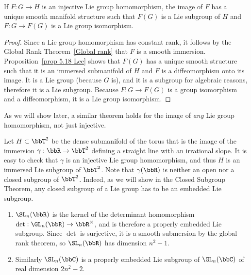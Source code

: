 \begin{prop}
    If $F:G\to H$ is an injective Lie group homomorphism, the image of $F$ has a unique smooth manifold structure such that $F(G)$ is a Lie subgroup of $H$ and $F:G\to F(G)$ is a Lie group isomorphism.
\end{prop}
\begin{proof}
    Since a Lie group homomorphism has constant rank, it follows by the Global Rank Theorem~\ref{Global rank} that $F$ is a smooth immersion. Proposition~\ref{prop 5.18 Lee} shows that $F(G)$ has a unique smooth structure such that it is an immersed submanifold of $H$ and $F$ is a diffeomorphism onto its image. It is a Lie group (because $G$ is), and it is a subgroup for algebraic reasons, therefore it is a Lie subgroup. Because $F:G\to F(G)$ is a group isomorphism and a diffeomorphism, it is a Lie group isomorphism.
\end{proof}
\begin{rem}
    As we will show later, a similar theorem holds for the image of \emph{any} Lie group homomorphism, not just injective.
\end{rem}

\begin{example}
    Let $H\subset \bbT^2$ be the dense submanifold of the torus that is the image of the immersion $\gamma:\bbR\to\bbT^2$ defining a straight line with an irrational slope. It is easy to check that $\gamma$ is an injective Lie group homomorphism, and thus $H$ is an immersed Lie subgroup of $\bbT^2$. Note that $\gamma(\bbR)$ is neither an open nor a closed subgroup of $\bbT^2$. Indeed, as we will show in the Closed Subgroup Theorem, any closed subgroup of a Lie group has to be an embedded Lie subgroup.
\end{example}

\begin{example}
    \begin{enumerate}[label=(\alph*)]
        \item $\SL_n(\bbR)$ is the kernel of the determinant homomorphism $\det:\GL_n(\bbR)\to \bbR^\times$, and is therefore a properly embedded Lie subgroup. Since $\det$ is surjective, it is a smooth submersion by the global rank theorem, so $\SL_n(\bbR)$ has dimension $n^2-1$.
        \item Similarly $\SL_n(\bbC)$ is a properly embedded Lie subgroup of $\GL_n(\bbC)$ of real dimension $2n^2-2$.
    \end{enumerate}
\end{example}

